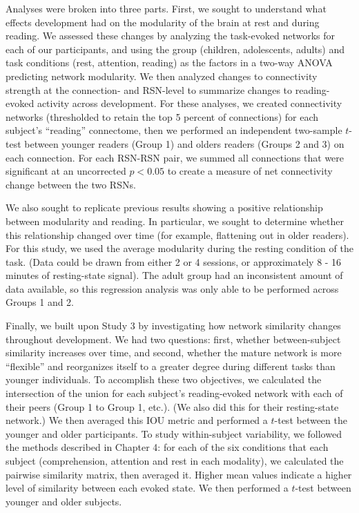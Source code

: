 Analyses were broken into three parts. First, we sought to understand what effects development had on the modularity of the brain at rest and during reading. We assessed these changes by analyzing the task-evoked networks for each of our participants, and using the group (children, adolescents, adults) and task conditions (rest, attention, reading) as the factors in a two-way ANOVA predicting network modularity. We then analyzed changes to connectivity strength at the connection- and RSN-level to summarize changes to reading-evoked activity across development. For these analyses, we created connectivity networks (thresholded to retain the top 5 percent of connections) for each subject's ``reading'' connectome, then we performed an independent two-sample $t$-test between younger readers (Group 1) and olders readers (Groups 2 and 3) on each connection. For each RSN-RSN pair, we summed all connections that were significant at an uncorrected $p < 0.05$ to create a measure of net connectivity change between the two RSNs.

We also sought to replicate previous results showing a positive relationship between modularity and reading. In particular, we sought to determine whether this relationship changed over time (for example, flattening out in older readers). For this study, we used the average modularity during the resting condition of the task. (Data could be drawn from either 2 or 4 sessions, or approximately 8 - 16 minutes of resting-state signal). The adult group had an inconsistent amount of data available, so this regression analysis was only able to be performed across Groups 1 and 2.

Finally, we built upon Study 3 by investigating how network similarity changes throughout development. We had two questions: first, whether between-subject similarity increases over time, and second, whether the mature network is more ``flexible'' and reorganizes itself to a greater degree during different tasks than younger individuals. To accomplish these two objectives, we calculated the intersection of the union for each subject's reading-evoked network with each of their peers (Group 1 to Group 1, etc.). (We also did this for their resting-state network.) We then averaged this IOU metric and performed a $t$-test between the younger and older participants. To study within-subject variability, we followed the methods described in Chapter 4: for each of the six conditions that each subject (comprehension, attention and rest in each modality), we calculated the pairwise similarity matrix, then averaged it. Higher mean values indicate a higher level of similarity between each evoked state. We then performed a $t$-test between younger and older subjects.



